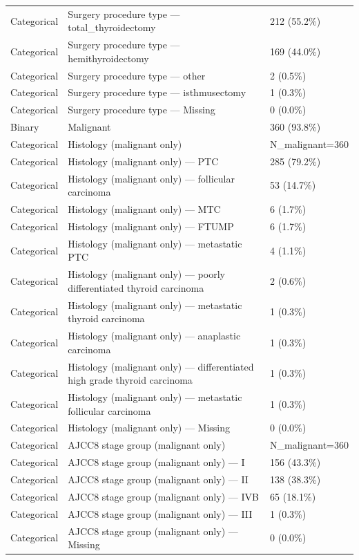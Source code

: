 \begin{table}[htbp]
\begin{tabular}{lll}
Categorical & Surgery procedure type — total\_thyroidectomy & 212 (55.2\%) \\
Categorical & Surgery procedure type — hemithyroidectomy & 169 (44.0\%) \\
Categorical & Surgery procedure type — other & 2 (0.5\%) \\
Categorical & Surgery procedure type — isthmusectomy & 1 (0.3\%) \\
Categorical & Surgery procedure type — Missing & 0 (0.0\%) \\
Binary & Malignant & 360 (93.8\%) \\
Categorical & Histology (malignant only) & N\_malignant=360 \\
Categorical & Histology (malignant only) — PTC & 285 (79.2\%) \\
Categorical & Histology (malignant only) — follicular carcinoma & 53 (14.7\%) \\
Categorical & Histology (malignant only) — MTC & 6 (1.7\%) \\
Categorical & Histology (malignant only) — FTUMP & 6 (1.7\%) \\
Categorical & Histology (malignant only) — metastatic PTC & 4 (1.1\%) \\
Categorical & Histology (malignant only) — poorly differentiated thyroid carcinoma & 2 (0.6\%) \\
Categorical & Histology (malignant only) — metastatic thyroid carcinoma & 1 (0.3\%) \\
Categorical & Histology (malignant only) — anaplastic carcinoma & 1 (0.3\%) \\
Categorical & Histology (malignant only) — differentiated high grade thyroid carcinoma & 1 (0.3\%) \\
Categorical & Histology (malignant only) — metastatic follicular carcinoma & 1 (0.3\%) \\
Categorical & Histology (malignant only) — Missing & 0 (0.0\%) \\
Categorical & AJCC8 stage group (malignant only) & N\_malignant=360 \\
Categorical & AJCC8 stage group (malignant only) — I & 156 (43.3\%) \\
Categorical & AJCC8 stage group (malignant only) — II & 138 (38.3\%) \\
Categorical & AJCC8 stage group (malignant only) — IVB & 65 (18.1\%) \\
Categorical & AJCC8 stage group (malignant only) — III & 1 (0.3\%) \\
Categorical & AJCC8 stage group (malignant only) — Missing & 0 (0.0\%) \\

\end{tabular}
\end{table}
